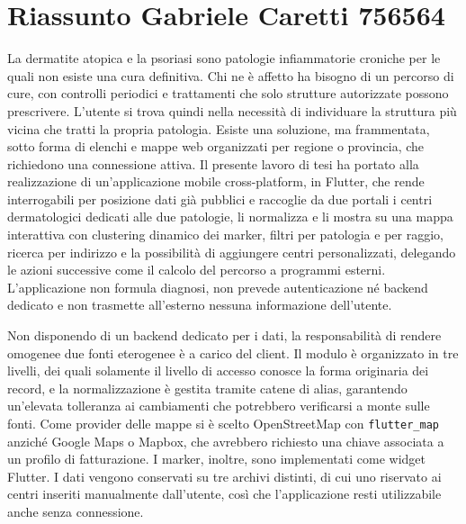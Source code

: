 \documentclass[a4paper, oneside, openright]{book}
\begin{document}
\chapter*{Riassunto Gabriele Caretti 756564}
\label{ch:riassunto}

La dermatite atopica e la psoriasi sono patologie infiammatorie croniche per le quali non esiste una cura definitiva.
Chi ne è affetto ha bisogno di un percorso di cure, con controlli periodici e trattamenti che solo strutture autorizzate
possono prescrivere.
L'utente si trova quindi nella necessità di individuare la struttura più vicina che tratti la propria patologia.
Esiste una soluzione, ma frammentata, sotto forma di elenchi e mappe web organizzati per regione o provincia,
che richiedono una connessione attiva.
Il presente lavoro di tesi ha portato alla realizzazione di un'applicazione mobile cross-platform, in Flutter, che rende interrogabili per
posizione dati già pubblici e raccoglie da due portali i centri dermatologici dedicati alle due patologie,
li normalizza e li mostra su una mappa interattiva con clustering dinamico dei marker, filtri per patologia e per
raggio, ricerca per indirizzo e la possibilità di aggiungere centri personalizzati, delegando le azioni successive
come il calcolo del percorso a programmi esterni.
L'applicazione non formula diagnosi, non prevede autenticazione né backend dedicato e non trasmette all'esterno nessuna
informazione dell'utente.

Non disponendo di un backend dedicato per i dati, la responsabilità di rendere omogenee due fonti eterogenee è a carico del client.
Il modulo è organizzato in tre livelli, dei quali solamente il livello di accesso conosce la forma originaria dei record, e la
normalizzazione è gestita tramite catene di alias, garantendo un'elevata tolleranza ai cambiamenti che potrebbero verificarsi a monte sulle fonti. %
Come provider delle mappe si è scelto OpenStreetMap con \texttt{flutter\_map} anziché Google Maps o Mapbox, che avrebbero
richiesto una chiave associata a un profilo di fatturazione.
I marker, inoltre, sono implementati come widget Flutter.
I dati vengono conservati su tre archivi distinti, di cui uno riservato ai centri inseriti manualmente dall'utente, %
così che l'applicazione resti utilizzabile anche senza connessione.
\end{document}

